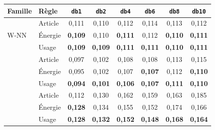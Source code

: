 \begin{tabular}{@{}llcccccc@{}}
\toprule
Famille & Règle & \texttt{db1} & \texttt{db2} & \texttt{db4} & \texttt{db6} & \texttt{db8} & \texttt{db10} \\
\midrule
\multirow{3}{*}{W-NN} & Article & 0{,}111 & 0{,}110 & 0{,}112 & 0{,}114 & 0{,}113 & 0{,}112 \\
 & Énergie & \textbf{0{,}109} & 0{,}110 & \textbf{0{,}111} & 0{,}112 & \textbf{0{,}110} & \textbf{0{,}111} \\
 & Usage & \textbf{0{,}109} & \textbf{0{,}109} & \textbf{0{,}111} & \textbf{0{,}111} & \textbf{0{,}110} & \textbf{0{,}111} \\
\addlinespace
\multirow{3}{*}{W-QDA} & Article & 0{,}097 & 0{,}102 & 0{,}108 & 0{,}108 & 0{,}113 & 0{,}115 \\
 & Énergie & 0{,}095 & 0{,}102 & 0{,}107 & \textbf{0{,}107} & 0{,}112 & \textbf{0{,}110} \\
 & Usage & \textbf{0{,}094} & \textbf{0{,}101} & \textbf{0{,}106} & \textbf{0{,}107} & \textbf{0{,}111} & \textbf{0{,}110} \\
\addlinespace
\multirow{3}{*}{W-CART} & Article & 0{,}112 & 0{,}130 & 0{,}162 & 0{,}159 & 0{,}163 & 0{,}185 \\
 & Énergie & \textbf{0{,}128} & 0{,}134 & 0{,}155 & 0{,}152 & 0{,}174 & 0{,}166 \\
 & Usage & \textbf{0{,}128} & \textbf{0{,}132} & \textbf{0{,}152} & \textbf{0{,}148} & \textbf{0{,}168} & \textbf{0{,}164} \\
\bottomrule
\end{tabular}
